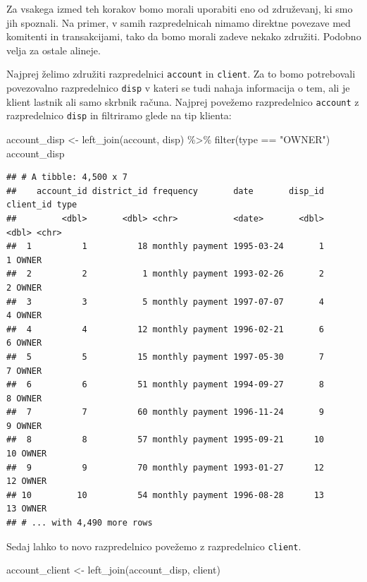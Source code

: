 \documentclass[
]{book}
\newenvironment{Shaded}{\begin{snugshade}}{\end{snugshade}}
\newcommand{\FunctionTok}[1]{\textcolor[rgb]{0.00,0.00,0.00}{#1}}
\newcommand{\NormalTok}[1]{#1}
\newcommand{\OtherTok}[1]{\textcolor[rgb]{0.56,0.35,0.01}{#1}}
\newcommand{\SpecialCharTok}[1]{\textcolor[rgb]{0.00,0.00,0.00}{#1}}
\newcommand{\StringTok}[1]{\textcolor[rgb]{0.31,0.60,0.02}{#1}}
\begin{document}
Za vsakega izmed teh korakov bomo morali uporabiti eno od združevanj, ki smo jih spoznali. Na primer, v samih razpredelnicah nimamo direktne povezave med komitenti in transakcijami, tako da bomo morali zadeve nekako združiti. Podobno velja za ostale alineje.

Najprej želimo združiti razpredelnici \texttt{account} in \texttt{client}. Za to bomo potrebovali povezovalno razpredelnico \texttt{disp} v kateri se tudi nahaja informacija o tem, ali je klient lastnik ali samo skrbnik računa. Najprej povežemo razpredelnico \texttt{account} z razpredelnico \texttt{disp} in filtriramo glede na tip klienta:

\begin{Shaded}
\begin{Highlighting}[]
\NormalTok{account\_disp }\OtherTok{\textless{}{-}} \FunctionTok{left\_join}\NormalTok{(account, disp) }\SpecialCharTok{\%\textgreater{}\%}
  \FunctionTok{filter}\NormalTok{(type }\SpecialCharTok{==} \StringTok{"OWNER"}\NormalTok{)}
\NormalTok{account\_disp}
\end{Highlighting}
\end{Shaded}

\begin{verbatim}
## # A tibble: 4,500 x 7
##    account_id district_id frequency       date       disp_id client_id type 
##         <dbl>       <dbl> <chr>           <date>       <dbl>     <dbl> <chr>
##  1          1          18 monthly payment 1995-03-24       1         1 OWNER
##  2          2           1 monthly payment 1993-02-26       2         2 OWNER
##  3          3           5 monthly payment 1997-07-07       4         4 OWNER
##  4          4          12 monthly payment 1996-02-21       6         6 OWNER
##  5          5          15 monthly payment 1997-05-30       7         7 OWNER
##  6          6          51 monthly payment 1994-09-27       8         8 OWNER
##  7          7          60 monthly payment 1996-11-24       9         9 OWNER
##  8          8          57 monthly payment 1995-09-21      10        10 OWNER
##  9          9          70 monthly payment 1993-01-27      12        12 OWNER
## 10         10          54 monthly payment 1996-08-28      13        13 OWNER
## # ... with 4,490 more rows
\end{verbatim}

Sedaj lahko to novo razpredelnico povežemo z razpredelnico \texttt{client}.

\begin{Shaded}
\begin{Highlighting}[]
\NormalTok{account\_client }\OtherTok{\textless{}{-}} \FunctionTok{left\_join}\NormalTok{(account\_disp, client)}
\end{Highlighting}
\end{Shaded}
\end{document}
